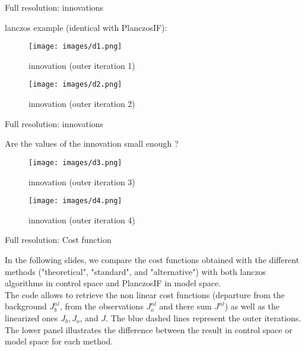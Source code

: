 \documentclass[francais]{beamer}
\begin{document}
\begin{frame}{Full resolution: innovations}
\begin{center}
lanczos example (identical with PlanczosIF):
\begin{figure}
  \texttt{[image: images/d1.png]}
  \caption{innovation (outer iteration 1)}
\endminipage\hfill
{}
  \texttt{[image: images/d2.png]}
  \caption{innovation (outer iteration 2)}
\endminipage
\end{figure}
\end{center}
\end{frame}

\begin{frame}{Full resolution: innovations}
\begin{center}
Are the values of the innovation small enough ?
\begin{figure}
  \texttt{[image: images/d3.png]}
  \caption{innovation (outer iteration 3)}
\endminipage \hfill
{}%
  \texttt{[image: images/d4.png]}
  \caption{innovation (outer iteration 4)}
\endminipage
\end{figure}
\end{center}
\end{frame}


\begin{frame}{Full resolution: Cost function}
\begin{center}
In the following slides, we compare the cost functions obtained with the different methods ("theoretical", "standard", and "alternative") with both lanczos algorithms in control space and PlanczosIF in model space.\\
\vspace{+1cm}
The code allows to retrieve the non linear cost functions (departure from the background $J^{nl}_b$, from the observations $J^{nl}_o$ and there sum $J^{nl}$) as well as the linearized ones $J_b,J_o$, and $J$.
\vspace{+1cm}
The blue dashed lines represent the outer iterations. The lower panel illustrates the difference between the result in control space or model space for each method.\\
\end{center}
\end{frame}
\end{document}
